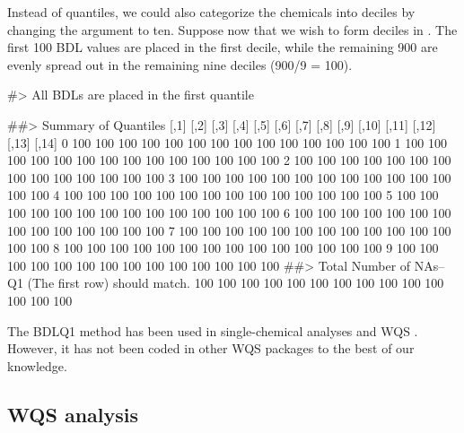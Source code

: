 Instead of quantiles, we could also categorize the chemicals into
deciles by changing the  argument to ten. Suppose now
that we wish to form deciles in . The first 100
BDL values are placed in the first decile, while the remaining 900 are
evenly spread out in the remaining nine deciles (900/9 = 100).

\begin{Schunk}
\begin{Soutput}
#> All BDLs are placed in the first quantile
\end{Soutput}
\begin{Soutput}
##> Summary of Quantiles 
  [,1] [,2] [,3] [,4] [,5] [,6] [,7] [,8] [,9] [,10] [,11] [,12] [,13] [,14]
0  100  100  100  100  100  100  100  100  100   100   100   100   100   100
1  100  100  100  100  100  100  100  100  100   100   100   100   100   100
2  100  100  100  100  100  100  100  100  100   100   100   100   100   100
3  100  100  100  100  100  100  100  100  100   100   100   100   100   100
4  100  100  100  100  100  100  100  100  100   100   100   100   100   100
5  100  100  100  100  100  100  100  100  100   100   100   100   100   100
6  100  100  100  100  100  100  100  100  100   100   100   100   100   100
7  100  100  100  100  100  100  100  100  100   100   100   100   100   100
8  100  100  100  100  100  100  100  100  100   100   100   100   100   100
9  100  100  100  100  100  100  100  100  100   100   100   100   100   100
##> Total Number of NAs--Q1 (The first row) should match.
100 100 100 100 100 100 100 100 100 100 100 100 100 100
\end{Soutput}
\end{Schunk}

The BDLQ1 method has been used in single-chemical analyses
\citep{metayerExposureHerbicidesHouse2013, wardResidentialLevelsPolybrominated2014, wardResidentialExposurePolychlorinated2009}
and WQS \citep{hargartenAccountingUncertaintyDue2020}. However, it has
not been coded in other WQS packages to the best of our knowledge.

\hypertarget{wqs-analysis}{%
\subsection{WQS analysis}\label{wqs-analysis}}

